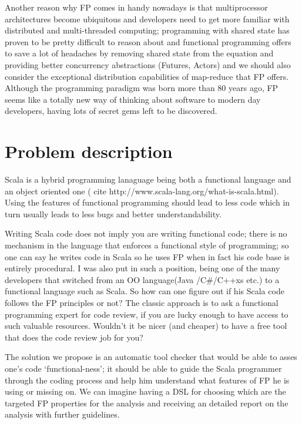 \documentclass{article}
\begin{document}
Another reason why FP comes in handy nowadays is that multiprocessor architectures become ubiquitous and developers need to get more familiar with distributed and multi-threaded computing; programming with shared state has proven to be pretty difficult to reason about and functional programming offers to save a lot of headaches by removing shared state from the equation and providing better concurrency abstractions (Futures, Actors) and we should also consider  the exceptional distribution capabilities of map-reduce that FP offers. Although the programming paradigm was born more than 80 years ago, FP seems like a totally new way of thinking about software to modern day developers, having lots of secret gems left to be discovered. \par

\section {Problem description}
Scala is a hybrid programming lanaguage being both a functional language and an object oriented one ( cite http://www.scala-lang.org/what-is-scala.html). Using the features of functional programming should lead to less code which in turn usually leads to less bugs and better understandability.  \par

Writing Scala code does not imply you are writing functional code;  there is no mechanism in the language that enforces a functional style of programming; so one can say he writes code in Scala so he uses FP when in fact his code base is entirely procedural. I was also put in such a position,  being one of the many  developers that  switched from an OO language(Java /C\#/C++xs etc.)  to a functional language such as Scala. So how can one figure out if his Scala code follows the FP principles or not? The classic approach is to ask a functional programming expert for code review, if you are lucky enough to have access to such valuable resources. Wouldn't it be nicer (and cheaper) to have a free tool that does the code review job for you? \par

The solution we propose is an automatic tool checker that would be able to asses one's code `functional-ness'; it should be able to guide the Scala programmer through the coding process and help him understand what features of FP he is using or missing on. We can imagine having a DSL for choosing which are the targeted FP properties for the analysis and receiving an detailed report on the analysis with further guidelines. \par
\end{document}
